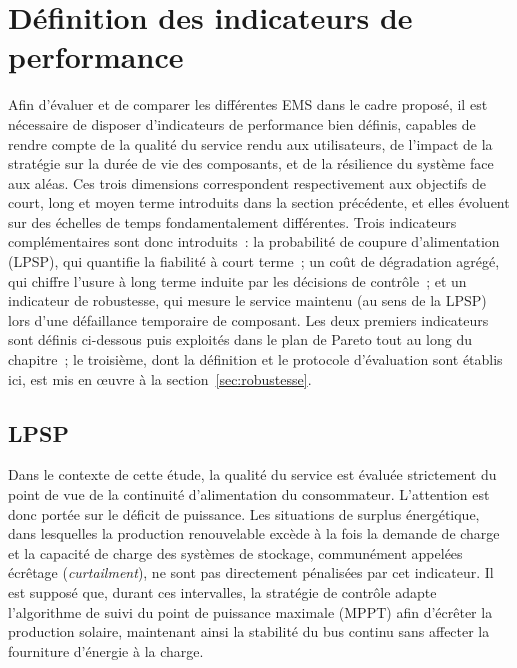 
\section{Définition des indicateurs de performance}
\label{sec:indicateurs}

Afin d'évaluer et de comparer les différentes EMS dans le cadre proposé, il est nécessaire de disposer d'indicateurs de performance bien définis, capables de rendre compte de la qualité du service rendu aux utilisateurs, de l'impact de la stratégie sur la durée de vie des composants, et de la résilience du système face aux aléas. Ces trois dimensions correspondent respectivement aux objectifs de court, long et moyen terme introduits dans la section précédente, et elles évoluent sur des échelles de temps fondamentalement différentes. Trois indicateurs complémentaires sont donc introduits~: la probabilité de coupure d'alimentation (LPSP), qui quantifie la fiabilité à court terme~; un coût de dégradation agrégé, qui chiffre l'usure à long terme induite par les décisions de contrôle~; et un indicateur de robustesse, qui mesure le service maintenu (au sens de la LPSP) lors d'une défaillance temporaire de composant. Les deux premiers indicateurs sont définis ci-dessous puis exploités dans le plan de Pareto tout au long du chapitre~; le troisième, dont la définition et le protocole d'évaluation sont établis ici, est mis en œuvre à la section~\ref{sec:robustesse}.

\subsection{LPSP}

Dans le contexte de cette étude, la qualité du service est évaluée strictement du point de vue de la continuité d'alimentation du consommateur. L'attention est donc portée sur le déficit de puissance. Les situations de surplus énergétique, dans lesquelles la production renouvelable excède à la fois la demande de charge et la capacité de charge des systèmes de stockage, communément appelées écrêtage (\textit{curtailment}), ne sont pas directement pénalisées par cet indicateur. Il est supposé que, durant ces intervalles, la stratégie de contrôle adapte l'algorithme de suivi du point de puissance maximale (MPPT) afin d'écrêter la production solaire, maintenant ainsi la stabilité du bus continu sans affecter la fourniture d'énergie à la charge.

